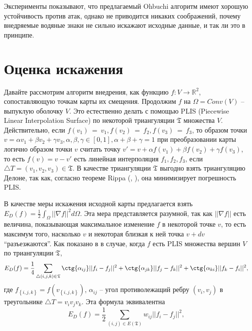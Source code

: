 \documentclass{article}
\begin{document}
Эксперименты показывают, что предлагаемый Ohbuchi алгоритм имеют хорошую устойчивость против атак, однако не приводится никаких соображений, почему внедряемые водяные знаки не сильно искажают исходные данные, и так ли это в принципе. 

\section{Оценка искажения}
Давайте рассмотрим алгоритм внедрения, как функцию $f: V \to \mathbb{R}^2$, сопоставляющую точкам карты их смещения. Продолжим $f$ на $\Omega = Conv(V)$ -- выпуклую оболочку $V$. Это естественно делать с помощью PLIS (Piecewise Linear Interpolation Surface) 
по некоторой триангуляции $\mathfrak{T}$ множества $V$. Действительно, если $f(v_1)~=~v_1, f(v_2)~=~f_2, f(v_3)~=~f_3$, то образом точки $v = \alpha v_1 + \beta v_2 + \gamma v_3, 
\alpha, \beta, \gamma \in [0, 1], \alpha + \beta + \gamma = 1$ при преобразовании карты логично образом точки $v$ считать точку $v' = v + \alpha f(v_1) + \beta f(v_2) + \gamma f(v_3)$, то есть $f(v) = v - v'$ есть линейная интерполяция $f_1, f_2, f_3$, если $\triangle T = (v_1, v_2, v_3) \in \mathfrak{T}$.
В качестве триангуляции $\mathfrak{T}$ выгодно взять триангуляцию Делоне, так как, согласно теореме Rippa (\cite{Rippa}, \cite{Chen}), она минимизирует погрешность PLIS.

В качестве меры искажения исходной карты предлагается взять $E_D(f) = \frac{1}{2} \int_{\Omega}{||\nabla f||^2}d\Omega$. Эта мера представляется разумной, так как $||\nabla f||$ есть величина, показывающая максимальное изменение $f$ в некоторой точке $v$, то есть максимум того, насколько 
$v$ и некоторая близкая к ней точка $v + dv$ ``разъезжаются''.
Как показано в \cite{Pinkall93} в случае, когда $f$ есть PLIS множества вершин $V$ по триангуляции $\mathfrak{T}$, 
\begin{equation*}
  E_D(f) = \frac{1}{4} \sum_{\triangle (i, j, k) \in \mathfrak{T}}
  {\ctg{\alpha_{ij}}||f_i - f_j||^2 + \ctg{\alpha_{jk}}||f_j - f_k||^2 + \ctg{\alpha_{ki}}||f_k - f_i||^2},
\end{equation*}
где $f_{\left\{i, j, k\right\}} = f(v_{\left\{i, j, k\right\}})$, $\alpha_{ij}$ -- угол противолежащий ребру $(v_i, v_j)$ в треугольнике $\triangle T = v_i v_j v_k$.
Эта формула эквивалентна
\begin{equation*}
  E_D(f) = \frac{1}{2} \sum_{\left( i, j \right) \in E\left(\mathfrak{T}\right)}{w_{ij} ||f_i - f_j||^2}, 
\end{equation*}
\end{document}
